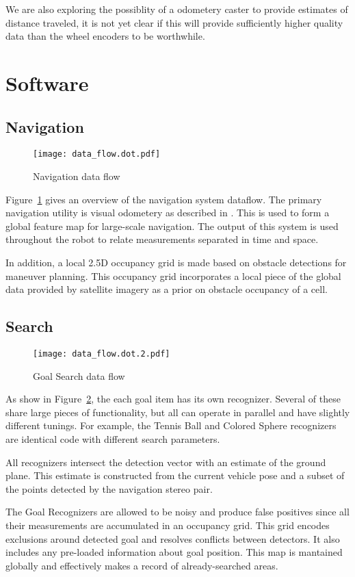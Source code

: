 \documentclass[12pt]{article}
\begin{document}
We are also exploring the possiblity of a odometery caster to provide estimates of distance traveled, it is not yet clear if this will provide sufficiently higher quality data than the wheel encoders to be worthwhile.

\section{Software}\label{Software}

\subsection{Navigation}\label{Navigation}
\begin{figure}
\centering
\texttt{[image: data\_flow.dot.pdf]}
\caption{Navigation data flow}
\label{fig_df_nav}
\end{figure}
Figure~\ref{fig_df_nav} gives an overview of the navigation system dataflow. The primary navigation utility is visual odometery as described in \cite{KKonoLSVO}. This is used to form a global feature map for large-scale navigation. The output of this system is used throughout the robot to relate measurements separated in time and space.

In addition, a local 2.5D occupancy grid is made based on obstacle detections for maneuver planning. This occupancy grid incorporates a local piece of the global data provided by satellite imagery as a prior on obstacle occupancy of a cell.

\subsection{Search}\label{Search}
\begin{figure}
\centering
\texttt{[image: data\_flow.dot.2.pdf]}
\caption{Goal Search data flow}
\label{fig_df_gs}
\end{figure}
As show in Figure~\ref{fig_df_gs}, the each goal item has its own recognizer. Several of these share large pieces of functionality, but all can operate in parallel and have slightly different tunings. For example, the Tennis Ball and Colored Sphere recognizers are identical code with different search parameters.

All recognizers intersect the detection vector with an estimate of the ground plane. This estimate is constructed from the current vehicle pose and a subset of the points detected by the navigation stereo pair.

The Goal Recognizers are allowed to be noisy and produce false positives since all their measurements are accumulated in an occupancy grid. This grid encodes exclusions around detected goal and resolves conflicts between detectors. It also includes any pre-loaded information about goal position. This map is mantained globally and effectively makes a record of already-searched areas.
\end{document}

